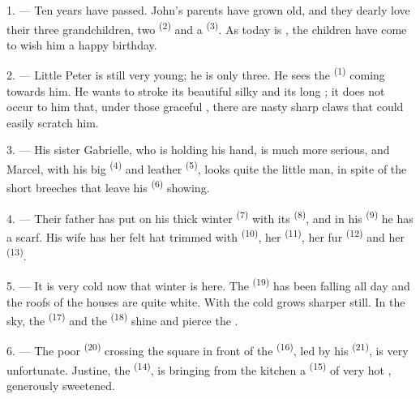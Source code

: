 \VUsaut{3.0mm}

1. --- Ten years have passed. John's parents have grown old, and they dearly love their three
grandchildren, two  \textsuperscript{(2)} and a 
\textsuperscript{(3)}. As today is
, the children have come to wish him a happy
birthday.

2. --- Little Peter is still very young; he is only three. He sees the
 \textsuperscript{(1)} coming towards him. He wants to stroke its
beautiful silky  and its long ; it does not occur to him that, under
those graceful , there are nasty sharp claws that could easily scratch him.

3. --- His sister Gabrielle, who is holding his hand, is much more serious, and Marcel, with
his big  \textsuperscript{(4)} and leather
 \textsuperscript{(5)}, looks quite the little man, in spite of the
short breeches that leave his  \textsuperscript{(6)} showing.

4. --- Their father has put on his thick winter  \textsuperscript{(7)} with
its  \textsuperscript{(8)}, and in his
 \textsuperscript{(9)} he has a scarf. His wife has her felt hat
trimmed with  \textsuperscript{(10)}, her 
\textsuperscript{(11)}, her fur  \textsuperscript{(12)} and her 
\textsuperscript{(13)}.

5. --- It is very cold now that winter is here. The  \textsuperscript{(19)} has
been falling all day and the roofs of the houses are quite white. With  the cold
grows sharper still. In the sky, the
 \textsuperscript{(17)} and the  \textsuperscript{(18)} shine and
pierce the .

\VUsaut{4.2mm}
\VUsaut{3.0mm}

6. --- The poor  \textsuperscript{(20)} crossing the square in front of the
 \textsuperscript{(16)}, led by his
 \textsuperscript{(21)}, is very unfortunate. Justine, the
 \textsuperscript{(14)}, is bringing from the kitchen a 
\textsuperscript{(15)} of very hot , generously sweetened.

